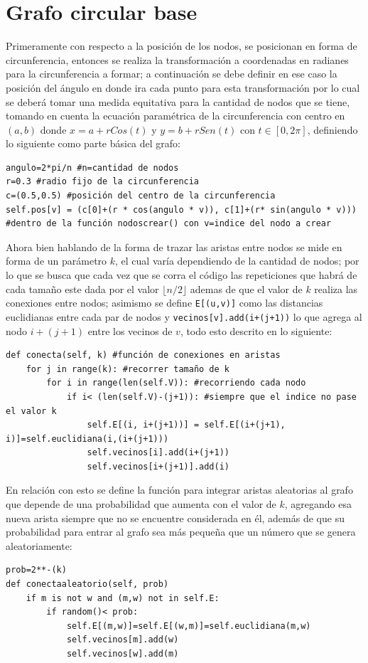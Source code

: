 \documentclass[12pt]{article}
\begin{document}
\section{Grafo circular base}
Primeramente con respecto a la posición de los nodos, se posicionan en forma de circunferencia, entonces se realiza la transformación a coordenadas en radianes para la circunferencia a formar; a continuación se debe definir en ese caso la posición del ángulo en donde ira cada punto para esta transformación por lo cual se deberá tomar una medida equitativa para la cantidad de nodos que se tiene, tomando en cuenta la ecuación paramétrica de la circunferencia con centro en $(a,b)$ donde $x=a+rCos(t)$ y $y=b+rSen(t)$ con $t\in[0,2\pi]$, definiendo lo siguiente como parte básica del grafo:
\begin{lstlisting}[style=tt]
angulo=2*pi/n #n=cantidad de nodos
r=0.3 #radio fijo de la circunferencia
c=(0.5,0.5) #posición del centro de la circunferencia
self.pos[v] = (c[0]+(r * cos(angulo * v)), c[1]+(r* sin(angulo * v))) #dentro de la función nodoscrear() con v=indice del nodo a crear
\end{lstlisting}
Ahora bien hablando de la forma de trazar las aristas entre nodos se mide en forma de un parámetro $k$, el cual varía dependiendo de la cantidad de nodos; por lo que se busca que cada vez que se corra el código las repeticiones que habrá de cada tamaño este dada por el valor $ \lfloor n/2 \rfloor $ ademas de que el valor de $k$ realiza las conexiones entre nodos; asimismo se define \texttt{E[(u,v)]} como las distancias euclidianas entre cada par de nodos y \texttt{vecinos[v].add(i+(j+1))} lo que agrega al nodo $i+(j+1)$  entre los vecinos de $v$, todo esto descrito en lo siguiente:
\begin{lstlisting}[style=tt]
def conecta(self, k) #función de conexiones en aristas
	for j in range(k): #recorrer tamaño de k
		for i in range(len(self.V)): #recorriendo cada nodo
			if i< (len(self.V)-(j+1)): #siempre que el indice no pase el valor k
				self.E[(i, i+(j+1))] = self.E[(i+(j+1), i)]=self.euclidiana(i,(i+(j+1)))
				self.vecinos[i].add(i+(j+1))
				self.vecinos[i+(j+1)].add(i)
\end{lstlisting}
En relación con esto se define la función para integrar aristas aleatorias al grafo que depende de una probabilidad que aumenta con el valor de $k$, agregando esa nueva arista siempre que no se encuentre considerada en él, además de que su probabilidad para entrar al grafo sea más pequeña que un número que se genera aleatoriamente:
\begin{lstlisting}[style=tt]
prob=2**-(k)
def conectaaleatorio(self, prob)
	if m is not w and (m,w) not in self.E:
		if random()< prob:
			self.E[(m,w)]=self.E[(w,m)]=self.euclidiana(m,w)
			self.vecinos[m].add(w)
			self.vecinos[w].add(m)
\end{lstlisting}
\end{document}
